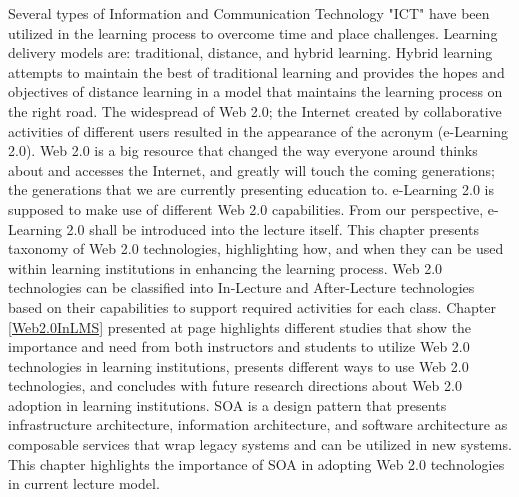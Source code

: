 \documentclass[12pt,a4paper,final,twoside,onecolumn,titlepage]{book}
\begin{document}
Several types of Information and Communication Technology "ICT" have been utilized in the learning process to overcome time and place challenges. Learning delivery models are: traditional, distance, and hybrid learning. Hybrid learning attempts to maintain the best of traditional learning and provides the hopes and objectives of distance learning in a model that maintains the learning process on the right road. The widespread of Web 2.0; the Internet created by collaborative activities of different users resulted in the appearance of the acronym (e-Learning 2.0). Web 2.0 is a big resource that changed the way everyone around thinks about and accesses the Internet, and greatly will touch the coming generations; the generations that we are currently presenting education to. e-Learning 2.0 is supposed to make use of different Web 2.0 capabilities. From our perspective, e-Learning 2.0 shall be introduced into the lecture itself. This chapter presents taxonomy of Web 2.0 technologies, highlighting how, and when they can be used within learning institutions in enhancing the learning process. Web 2.0 technologies can be classified into In-Lecture and After-Lecture technologies based on their capabilities to support required activities for each class. Chapter \ref{Web2.0InLMS} presented at page \pageref{Web2.0InLMS} highlights different studies that show the importance and need from both instructors and students to utilize Web 2.0 technologies in learning institutions, presents different ways to use Web 2.0 technologies, and concludes with future research directions about Web 2.0 adoption in learning institutions. \gls{SOA} is a design pattern that presents infrastructure architecture, information architecture, and software architecture as composable services that wrap legacy systems and can be utilized in new systems. This chapter highlights the importance of \gls{SOA} in adopting Web 2.0 technologies in current lecture model.
\end{document}
